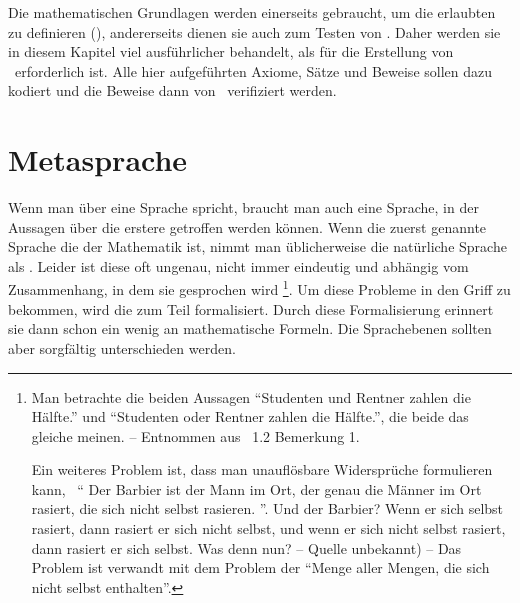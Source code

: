 Die mathematischen Grundlagen werden einerseits gebraucht, um die erlaubten  zu definieren (), andererseits dienen sie auch zum Testen von \ASBA.
Daher werden sie in diesem Kapitel viel ausführlicher behandelt, als für die Erstellung von \ASBA\ erforderlich ist.
Alle hier aufgeführten Axiome, Sätze und Beweise sollen dazu kodiert und die Beweise dann von \ASBA\ verifiziert werden.

\section{Metasprache}%
\label{sec:Metasprache}


\begingroup%
\renewcommand*{\objqt }[1]          {#1}%
\renewcommand*{\charqt}[1]{\enquote*{#1}}%
\renewcommand*{\strqt }[1]{\enquote {#1}}%

Wenn man über eine Sprache spricht, braucht man auch eine Sprache, in der Aussagen über die erstere getroffen werden können.
Wenn die zuerst genannte Sprache die der Mathematik ist, nimmt man üblicherweise die natürliche Sprache als .
Leider ist diese oft ungenau, nicht immer eindeutig und abhängig vom Zusammenhang, in dem sie gesprochen wird%
\footnote{%
	Man betrachte die beiden Aussagen \strqt{Studenten und Rentner zahlen die Hälfte.} und \strqt{Studenten oder Rentner zahlen die Hälfte.}, die beide das gleiche meinen.
	-- Entnommen aus \cite{bib:Rautenberg} \sectionname~1.2 Bemerkung 1.

	Ein weiteres Problem ist, dass man unauflösbare Widersprüche formulieren kann, \textzB\ \strqt{%
		Der Barbier ist der Mann im Ort, der genau die Männer im Ort rasiert, die sich nicht selbst rasieren.%
	}.
	Und der Barbier?
	Wenn er sich selbst rasiert, dann rasiert er sich nicht selbst, und wenn er sich nicht selbst rasiert, dann rasiert er sich selbst.
	Was denn nun?
	-- Quelle unbekannt) --
	Das Problem ist verwandt mit dem Problem der \strqt{Menge aller Mengen, die sich nicht selbst enthalten}.%
}.
Um diese Probleme in den Griff zu bekommen, wird die  zum Teil formalisiert.
Durch diese Formalisierung erinnert sie dann schon ein wenig an mathematische Formeln.
Die Sprachebenen sollten aber sorgfältig unterschieden werden.

